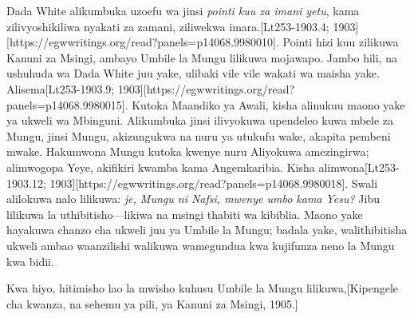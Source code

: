 Dada White alikumbuka uzoefu wa jinsi \textit{pointi kuu za imani yetu}, kama zilivyoshikiliwa nyakati za zamani, ziliwekwa imara.[Lt253-1903.4; 1903][https://egwwritings.org/read?panels=p14068.9980010]. Pointi hizi kuu zilikuwa Kanuni za Msingi, ambayo Umbile la Mungu lilikuwa mojawapo. Jambo hili, na ushuhuda wa Dada White juu yake, ulibaki vile vile wakati wa maisha yake. Alisema[Lt253-1903.9; 1903][https://egwwritings.org/read?panels=p14068.9980015]. Kutoka Maandiko ya Awali, kisha alinukuu maono yake ya ukweli wa Mbinguni. Alikumbuka jinsi ilivyokuwa upendeleo kuwa mbele za Mungu, jinsi Mungu, akizungukwa na nuru ya utukufu wake, akapita pembeni mwake. Hakumwona Mungu kutoka kwenye nuru Aliyokuwa amezingirwa; alimwogopa Yeye, akifikiri kwamba kama Angemkaribia. Kisha alimwona[Lt253-1903.12; 1903][https://egwwritings.org/read?panels=p14068.9980018]. Swali alilokuwa nalo lilikuwa: \textit{je, Mungu ni Nafsi, mwenye umbo kama Yesu?} Jibu lilikuwa la uthibitisho—likiwa na msingi thabiti wa kibiblia. Maono yake hayakuwa chanzo cha ukweli juu ya Umbile la Mungu; badala yake, walithibitisha ukweli ambao waanzilishi walikuwa wamegundua kwa kujifunza neno la Mungu kwa bidii.

Kwa hiyo, hitimisho lao la mwisho kuhusu Umbile la Mungu lilikuwa,[Kipengele cha kwanza, na sehemu ya pili, ya Kanuni za Msingi, 1905.]

